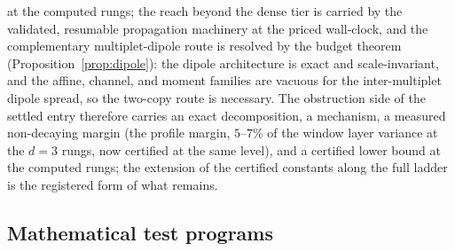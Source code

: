\documentclass[11pt,a4paper]{article}
\theoremstyle{plain}
\theoremstyle{definition}
\theoremstyle{remark}
\begin{document}
at the computed rungs; the reach beyond the dense tier is carried by the validated,
resumable propagation machinery at the priced wall-clock, and the complementary
multiplet-dipole route is resolved by the budget theorem
(Proposition~\ref{prop:dipole}): the dipole architecture is exact and
scale-invariant, and the affine, channel, and moment families are vacuous
for the inter-multiplet dipole spread, so the two-copy route is necessary.
The obstruction side of
the settled entry therefore carries an exact decomposition, a mechanism, a measured
non-decaying margin (the profile margin, $5$--$7\%$ of the window layer variance at
the $d=3$ rungs, now certified at the same level), and a certified lower bound at
the computed rungs; the extension of the certified
constants along the full ladder is the registered form of what remains.

\subsection{Mathematical test programs}\label{sec:mathprograms}
\end{document}
